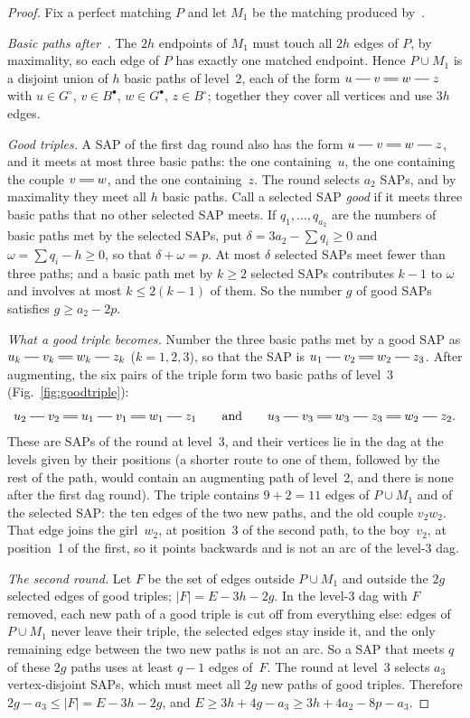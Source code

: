\begin{proof}
Fix a perfect matching $P$ and let $M_1$ be the matching produced by~.

\emph{Basic paths after~.} The $2h$ endpoints of $M_1$ must touch all
$2h$ edges of $P$, by maximality, so each edge of $P$ has exactly one
matched endpoint. Hence $P\cup M_1$ is a disjoint union of $h$ basic paths
of level~2, each of the form $u\sg v\db w\sg z$ with $u\in G^\circ$, $v\in
B^\bullet$, $w\in G^\bullet$, $z\in B^\circ$; together they cover all
vertices and use $3h$ edges.

\emph{Good triples.} A SAP of the first dag round also has the form
$u\sg v\db w\sg z$, and it meets at most three basic paths: the one
containing~$u$, the one containing the couple $v\db w$, and the one
containing~$z$. The round selects $a_2$ SAPs, and by maximality they meet
all $h$ basic paths. Call a selected SAP \emph{good} if it meets three basic
paths that no other selected SAP meets. If $q_1,\ldots,q_{a_2}$ are the
numbers of basic paths met by the selected SAPs, put
$\delta=3a_2-\sum q_i\ge0$ and $\omega=\sum q_i-h\ge0$, so that
$\delta+\omega=p$. At most $\delta$ selected SAPs meet fewer than three
paths; and a basic path met by $k\ge2$ selected SAPs contributes $k-1$ to
$\omega$ and involves at most $k\le2(k-1)$ of them. So the number $g$ of
good SAPs satisfies $g\ge a_2-2p$.

\emph{What a good triple becomes.} Number the three basic paths met by a good
SAP as $u_k\sg v_k\db w_k\sg z_k$ ($k=1,2,3$), so that the SAP is
$u_1\sg v_2\db w_2\sg z_3$. After augmenting, the six pairs of the triple
form two basic paths of level~3 (Fig.~\ref{fig:goodtriple}):
\[
  u_2\sg v_2\db u_1\sg v_1\db w_1\sg z_1\qquad\text{and}\qquad
  u_3\sg v_3\db w_3\sg z_3\db w_2\sg z_2 .
\]
These are SAPs of the round at level~3, and their vertices lie in the dag
at the levels given by their positions (a shorter route to one of them,
followed by the rest of the path, would contain an augmenting path of
level~2, and there is none after the first dag round). The triple contains
$9+2=11$ edges of $P\cup M_1$ and of the selected SAP: the ten edges of the
two new paths, and the old couple $v_2w_2$. That edge joins the girl~$w_2$,
at position~3 of the second path, to the boy~$v_2$, at position~1 of the
first, so it points backwards and is not an arc of the level-3 dag.

\emph{The second round.} Let $F$ be the set of edges outside $P\cup M_1$ and
outside the $2g$ selected edges of good triples; $|F|=E-3h-2g$. In the
level-3 dag with $F$ removed, each new path of a good triple is cut off
from everything else: edges of $P\cup M_1$ never leave their triple, the
selected edges stay inside it, and the only remaining edge between the two
new paths is not an arc. So a SAP that meets $q$ of these $2g$ paths uses at
least $q-1$ edges of~$F$. The round at level~3 selects $a_3$ vertex-disjoint
SAPs, which must meet all $2g$ new paths of good triples. Therefore
$2g-a_3\le|F|=E-3h-2g$, and $E\ge3h+4g-a_3\ge3h+4a_2-8p-a_3$.


\end{proof}
